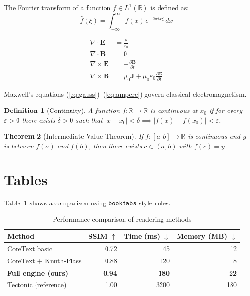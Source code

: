\documentclass[12pt,a4paper]{article}
\newcommand{\R}{\mathbb{R}}
\newcommand{\abs}[1]{\left|#1\right|}
\newtheorem{theorem}{Theorem}[section]
\newtheorem{definition}[theorem]{Definition}
\begin{document}
The Fourier transform of a function $f \in L^1(\R)$ is defined as:
\begin{equation}
  \hat{f}(\xi) = \int_{-\infty}^{\infty} f(x)\, e^{-2\pi i x \xi}\, dx
  \label{eq:fourier}
\end{equation}

\begin{align}
  \nabla \cdot \mathbf{E} &= \frac{\rho}{\varepsilon_0} \label{eq:gauss}\\
  \nabla \cdot \mathbf{B} &= 0 \label{eq:no-mono}\\
  \nabla \times \mathbf{E} &= -\frac{\partial \mathbf{B}}{\partial t} \label{eq:faraday}\\
  \nabla \times \mathbf{B} &= \mu_0\mathbf{J} + \mu_0\varepsilon_0\frac{\partial \mathbf{E}}{\partial t}
  \label{eq:ampere}
\end{align}

Maxwell's equations (\ref{eq:gauss})--(\ref{eq:ampere}) govern classical electromagnetism.

\begin{definition}[Continuity]
A function $f: \R \to \R$ is \emph{continuous} at $x_0$ if for every $\varepsilon > 0$
there exists $\delta > 0$ such that $\abs{x - x_0} < \delta \implies \abs{f(x) - f(x_0)} < \varepsilon$.
\end{definition}

\begin{theorem}[Intermediate Value Theorem]
\label{thm:ivt}
If $f: [a,b] \to \R$ is continuous and $y$ is between $f(a)$ and $f(b)$, then there
exists $c \in (a,b)$ with $f(c) = y$.
\end{theorem}

\section{Tables}
\label{sec:tables}

Table~\ref{tab:results} shows a comparison using \texttt{booktabs} style rules.

\begin{table}[h]
  \centering
  \caption{Performance comparison of rendering methods}
  \label{tab:results}
  \begin{tabular}{@{}lrrr@{}}
    \toprule
    Method & SSIM $\uparrow$ & Time (ms) $\downarrow$ & Memory (MB) $\downarrow$ \\
    \midrule
    CoreText basic & 0.72 & 45 & 12 \\
    CoreText + Knuth-Plass & 0.88 & 120 & 18 \\
    \textbf{Full engine (ours)} & \textbf{0.94} & \textbf{180} & \textbf{22} \\
    \midrule
    Tectonic (reference) & 1.00 & 3200 & 180 \\
    \bottomrule
  \end{tabular}
\end{table}
\end{document}
